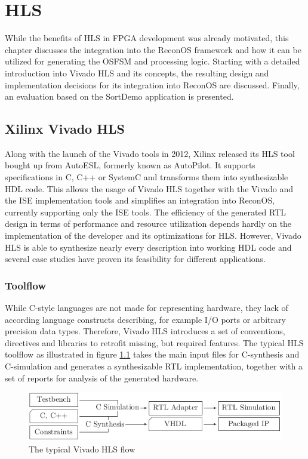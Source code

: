 \chapter{\acl{HLS}}
\label{chap:hls}
While the benefits of \ac{HLS} in \ac{FPGA} development was already motivated,
this chapter discusses the integration into the ReconOS framework and how it
can be utilized for generating the \ac{OSFSM} and processing logic. Starting
with a detailed introduction into Vivado HLS and its concepts, the resulting
design and implementation decisions for its integration into ReconOS are
discussed. Finally, an evaluation based on the SortDemo application is
presented.

\section{Xilinx Vivado HLS}
Along with the launch of the Vivado tools in 2012, Xilinx released its
\ac{HLS} tool bought up from AutoESL, formerly known as AutoPilot. It supports
specifications in C, C++ or SystemC and transforms them into synthesizable
\ac{HDL} code. This allows the usage of Vivado \ac{HLS} together with the
Vivado and the ISE implementation tools and simplifies an integration into
ReconOS, currently supporting only the ISE tools. The efficiency of the
generated RTL design in terms of performance and resource utilization depends
hardly on the implementation of the developer and its optimizations for
\ac{HLS}. However, Vivado HLS is able to synthesize nearly every description
into working \ac{HDL} code and several case studies \citep{SWL13,OCC14} have
proven its feasibility for different applications.

\subsection{Toolflow}
While C-style languages are not made for representing hardware, they lack of
according language constructs describing, for example I/O ports or arbitrary
precision data types. Therefore, Vivado HLS introduces a set of conventions,
directives and libraries to retrofit missing, but required features. The
typical \ac{HLS} toolflow as illustrated in figure \ref{fig:hls_flow} takes
the main input files for C-synthesis and C-simulation and generates a
synthesizable \ac{RTL} implementation, together with a set of reports for
analysis of the generated hardware.
\begin{figure}[tb]
	\centering
	\includegraphics{../figures/hls_flow}
	\caption{The typical Vivado HLS flow \citep[adapted from][]{ug902}}
	\label{fig:hls_flow}
\end{figure}

